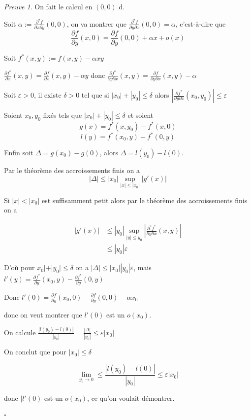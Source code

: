 \documentclass[]{article}
\theoremstyle{remark}
\newtheorem{myproof}{Preuve}
\theoremstyle{definition}
\newcommand{\cqfd}{
	\hfill$\square$
}
\begin{document}
\begin{myproof}
		On fait le calcul en $(0, 0)$ d.
		
		Soit $\displaystyle \alpha := \frac{\partial^2 f}{\partial x \partial y}(0, 0)$, on va montrer que $\displaystyle \frac{\partial^2 f}{\partial y \partial x}(0, 0) = \alpha$, c'est-à-dire que $$\frac{\partial f}{\partial y}(x, 0) = \frac{\partial f}{\partial y}(0, 0) + \alpha x + o(x)$$
		
		Soit $f^*(x, y) := f(x, y) - \alpha xy$
		
		$\displaystyle \frac{\partial f^*}{\partial x}(x, y) = \frac{\partial f}{\partial x}(x, y) - \alpha y$ donc $\displaystyle \frac{\partial f^*}{\partial y \partial x}(x, y) = \frac{\partial f}{\partial y \partial x}(x, y) - \alpha$
		
		Soit $\varepsilon > 0$, il existe $\delta > 0$ tel que si $|x_0| + |y_0| \leqslant \delta$ alors $\displaystyle \left|\frac{\partial f^*}{\partial y \partial x}(x_0, y_0)\right| \leqslant\varepsilon$
		
		Soient $x_0, y_0$ fixés tels que $|x_0| + |y_0| \leqslant \delta$ et soient $$g(x) = f^*(x, y_0) - f^*(x, 0)$$
		$$l(y) = f^*(x_0, y) - f^*(0, y)$$
		
		Enfin soit $\Delta = g(x_0) - g(0)$, alors $\Delta = l(y_0) - l(0)$.
		
		Par le théorème des accroissements finis on a
		$$|\Delta| \leqslant |x_0| \sup_{|x| \leqslant |x_0|} |g'(x)|$$
		
		Si $|x| < |x_0|$ est suffisamment petit alors par le théorème des accroissements finis on a
		
		$$\begin{aligned}
			|g'(x)| &\leqslant |y_0|\sup_{|y| \leqslant y_0} \left|\frac{\partial^2 f^*}{\partial y\partial x}(x, y)\right|\\
			&\leqslant |y_0| \varepsilon
		\end{aligned}$$
		
		D'où pour $x_0| + |y_0| \leqslant \delta$ on a $|\Delta| \leqslant |x_0||y_0|\varepsilon$, mais $\displaystyle l'(y) = \frac{\partial f^*}{\partial y}(x_0, y) - \frac{\partial f^*}{\partial y}(0, y)$
		
		Donc $\displaystyle l'(0) = \frac{\partial f}{\partial y}(x_0, 0) - \frac{\partial f}{\partial y}(0, 0) - \alpha x_0$
		
		donc on veut montrer que $l'(0)$ est un $o(x_0)$.
		
		On calcule $\displaystyle \frac{|l(y_0) - l(0)|}{|y_0|} = \frac{|\Delta|}{|y_0|} \leqslant \varepsilon |x_0|$
		
		On conclut que pour $|x_0| \leqslant \delta$
		
		$$\lim\limits_{y_0 \to 0} \leqslant \frac{|l(y_0) - l(0)|}{|y_0|} \leqslant \varepsilon |x_0|$$
		
		donc $|l'(0)$ est un $o(x_0)$, ce qu'on voulait démontrer.
		
		\cqfd
\end{myproof}
\end{document}
